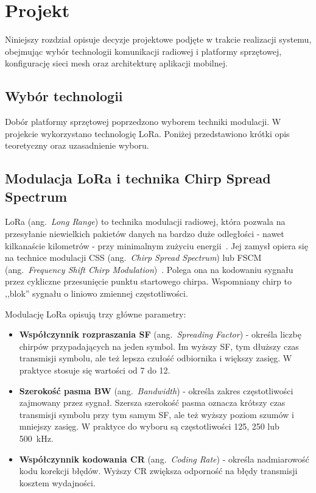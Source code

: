 \newpage
\section{Projekt}

Niniejszy rozdział opisuje decyzje projektowe podjęte w trakcie realizacji systemu,
obejmując wybór technologii komunikacji radiowej i platformy sprzętowej, konfigurację
sieci mesh oraz architekturę aplikacji mobilnej.

\subsection*{Wybór technologii}

Dobór platformy sprzętowej poprzedzono wyborem techniki modulacji. W projekcie wykorzystano technologię
LoRa. Poniżej przedstawiono krótki opis teoretyczny oraz uzasadnienie wyboru.

\subsection*{Modulacja LoRa i technika Chirp Spread Spectrum}
\label{sec:modulacja-lora}
LoRa (ang.\ \textit{Long Range}) to technika modulacji radiowej, która pozwala na przesyłanie
niewielkich pakietów danych na bardzo duże odległości - nawet kilkanaście kilometrów - przy
minimalnym zużyciu energii~\cite{govPlLora}.
Jej zamysł opiera się na technice modulacji CSS (ang.\ \textit{Chirp Spread Spectrum}) lub FSCM
(ang.\ \textit{Frequency Shift Chirp Modulation})~\cite{vangelista2017lora}. Polega ona na
kodowaniu sygnału przez cykliczne przesunięcie punktu startowego chirpa. Wspomniany chirp to
,,blok'' sygnału o liniowo zmiennej częstotliwości.

Modulację LoRa opisują trzy główne parametry:
\begin{itemize}
    \item \textbf{Współczynnik rozpraszania SF} (ang.\ \textit{Spreading Factor}) - określa
          liczbę chirpów przypadających na jeden symbol. Im wyższy SF, tym dłuższy czas transmisji
          symbolu, ale też lepsza czułość odbiornika i większy zasięg. W praktyce stosuje się
          wartości od 7 do 12.

    \item \textbf{Szerokość pasma BW} (ang.\ \textit{Bandwidth}) - określa zakres częstotliwości
          zajmowany przez sygnał. Szersza szerokość pasma oznacza krótszy czas transmisji symbolu
          przy tym samym SF, ale też wyższy poziom szumów i mniejszy zasięg. W praktyce do wyboru
          są częstotliwości 125, 250 lub 500~kHz.

    \item \textbf{Współczynnik kodowania CR} (ang.\ \textit{Coding Rate}) - określa nadmiarowość
          kodu korekcji błędów. Wyższy CR zwiększa odporność na błędy transmisji kosztem wydajności.
\end{itemize}

